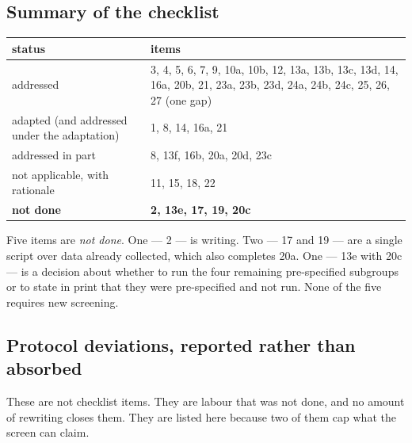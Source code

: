 \documentclass[11pt,a4paper]{article}
\begin{document}
\subsection{Summary of the checklist}

\begin{table}[htbp]
\centering
\small
\begin{tabular}{@{}L{4.4cm}L{9.4cm}@{}}
\toprule
status & items \\
\midrule
addressed & 3, 4, 5, 6, 7, 9, 10a, 10b, 12, 13a, 13b, 13c, 13d, 14, 16a, 20b, 21, 23a, 23b, 23d, 24a, 24b, 24c, 25, 26, 27 (one gap) \\
adapted (and addressed under the adaptation) & 1, 8, 14, 16a, 21 \\
addressed in part & 8, 13f, 16b, 20a, 20d, 23c \\
not applicable, with rationale & 11, 15, 18, 22 \\
\textbf{not done} & \textbf{2, 13e, 17, 19, 20c} \\
\bottomrule
\end{tabular}
\end{table}

Five items are \emph{not done}. One --- 2 --- is writing. Two --- 17 and 19 ---
are a single script over data already collected, which also completes 20a. One ---
13e with 20c --- is a decision about whether to run the four remaining pre-specified
subgroups or to state in print that they were pre-specified and not run. None of the
five requires new screening.

\subsection{Protocol deviations, reported rather than absorbed}

These are not checklist items. They are labour that was not done, and no amount of
rewriting closes them. They are listed here because two of them cap what the screen
can claim.
\end{document}
